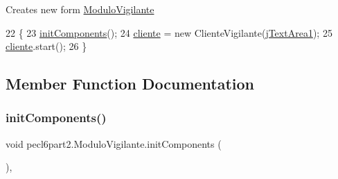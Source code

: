 Creates new form \mbox{\hyperlink{classpecl6part2_1_1_modulo_vigilante}{Modulo\+Vigilante}} 
\begin{DoxyCode}
22                              \{
23         \mbox{\hyperlink{classpecl6part2_1_1_modulo_vigilante_abf15a8aaafb98122919094a798f7455d}{initComponents}}();
24         \mbox{\hyperlink{classpecl6part2_1_1_modulo_vigilante_a1eeb1ecf2825987aa4aee43982b788e7}{cliente}} = \textcolor{keyword}{new} ClienteVigilante(\mbox{\hyperlink{classpecl6part2_1_1_modulo_vigilante_aafe6d08a0cded994a11a7d3dbf753f91}{jTextArea1}});
25         \mbox{\hyperlink{classpecl6part2_1_1_modulo_vigilante_a1eeb1ecf2825987aa4aee43982b788e7}{cliente}}.start();
26     \}
\end{DoxyCode}


\subsection{Member Function Documentation}
\mbox{\label{classpecl6part2_1_1_modulo_vigilante_abf15a8aaafb98122919094a798f7455d}} 
\subsubsection{\texorpdfstring{init\+Components()}{initComponents()}}
{\footnotesize\ttfamily void pecl6part2.\+Modulo\+Vigilante.\+init\+Components (\begin{DoxyParamCaption}{ }\end{DoxyParamCaption})\hspace{0.3cm}{\ttfamily [inline]}, {\ttfamily [private]}}

